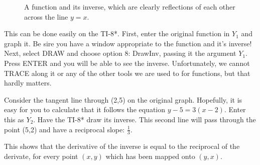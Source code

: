 \begin{figure}[h]
\begin{centering}
\caption[Graphical example of inverses]{A function and its inverse, which are clearly reflections of each other across the line $y=x$.}
\end{centering}
\end{figure}

This can be done easily on the TI-8*.   First, enter the original function in $Y_1$ and graph
it.  Be sire you have a window appropriate to the function and it's inverse!  Next, select DRAW
and choose option 8: DrawInv, passing it the argument $Y_1$.  Press ENTER and 
you will be able to see the inverse.  Unfortunately, we cannot TRACE along it or any of the 
other tools we are used to for functions, but that hardly matters.  

Consider the tangent line through (2,5) on the original graph.  Hopefully, it is easy for
you to calculate that it follows the equation $y-5=3(x-2)$.  Enter this as $Y_2$.
Have the TI-8* draw its inverse.  This second line will pass through the point (5,2)
and have a reciprocal slope: $\frac{1}{3}$.

This shows that the derivative of the inverse is equal to the reciprocal of the derivate,
for every point $(x,y)$ which has been mapped onto $(y,x)$.
